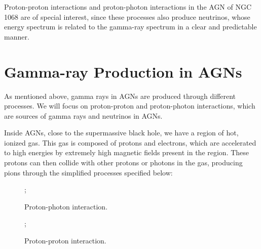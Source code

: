Proton-proton interactions and proton-photon interactions in the AGN of NGC 1068 are of special interest, since these processes also produce neutrinos, whose energy spectrum is related to the gamma-ray spectrum in a clear and predictable manner.


\section{Gamma-ray Production in AGNs}

As mentioned above, gamma rays in AGNs are produced through different processes. We will focus on proton-proton and proton-photon interactions, which are sources of gamma rays and neutrinos in AGNs.

Inside AGNs, close to the supermassive black hole, we have a region of hot, ionized gas. This gas is composed of protons and electrons, which are accelerated to high energies by extremely high magnetic fields present in the region. These protons can then collide with other protons or photons in the gas, producing pions through the simplified processes specified below:


\begin{figure}[H]
    \centering
    ;
    \caption{Proton-photon interaction.}
  \end{figure}

\begin{figure}[H]
  \centering
  ;
  \caption{Proton-proton interaction.}

\end{figure}

